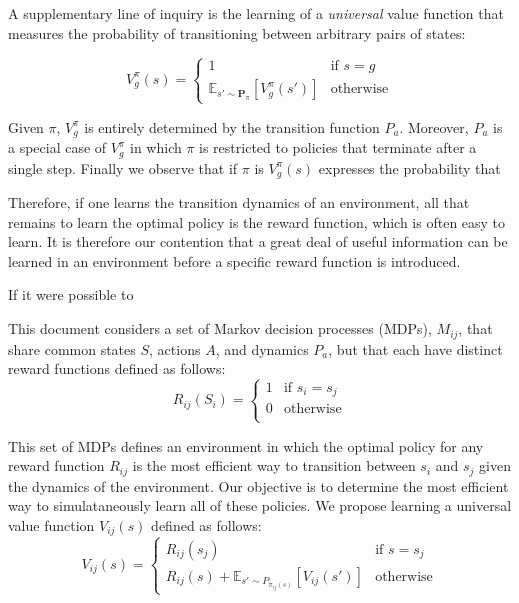 \documentclass{article}
\begin{document}
A supplementary line of inquiry is the learning of a \textit{universal} value function that measures the probability of transitioning between arbitrary pairs of states:

\[ 
V_{g}^\pi(s) = 
  \begin{cases}
    1 & \text{if } s = g \\ 
    \mathbb{E}_{s' \sim \mathbf{P}_{\pi}}\left [ V_{g}^\pi(s') \right ] & \text{otherwise}
  \end{cases}
\]

Given $\pi$, $V_{g}^\pi$ is entirely determined by the transition function $P_a$. Moreover, $P_a$ is a special case of $V_{g}^\pi$ in which $\pi$ is restricted to policies that terminate after a single step. Finally we observe that if $\pi$ is $V_{g}^\pi(s)$ expresses the probability that 

Therefore, if one learns the transition dynamics of an environment, all that remains to learn the optimal policy is the reward function, which is often easy to learn. It is therefore our contention that a great deal of useful information can be learned in an environment before a specific reward function is introduced. 

If it were possible to 




This document considers a set of Markov decision processes (MDPs), $M_{ij}$, that share common states $S$, actions $A$, and dynamics $P_a$, but that each have distinct reward functions defined as follows:
\[
  R_{ij}(S_i) = 
  \begin{cases}
    1 & \text{if } s_i = s_j \\ 
    0 & \text{otherwise} \\ 
  \end{cases}
\]

This set of MDPs defines an environment in which the optimal policy for any reward function $R_{ij}$ is the most efficient way to transition between $s_i$ and $s_j$ given the dynamics of the environment. Our objective is to determine the most efficient way to simulataneously learn all of these policies. We propose learning a universal value function $V_{ij}(s)$ defined as follows:
\[ 
V_{ij}(s) = 
  \begin{cases}
    R_{ij}(s_j) & \text{if } s = s_j \\ 
    R_{ij}(s) + \mathbb{E}_{s' \sim P_{\pi_{ij}(s)}}\left [ V_{ij}(s') \right ] & \text{otherwise}
  \end{cases}
\]
\end{document}
